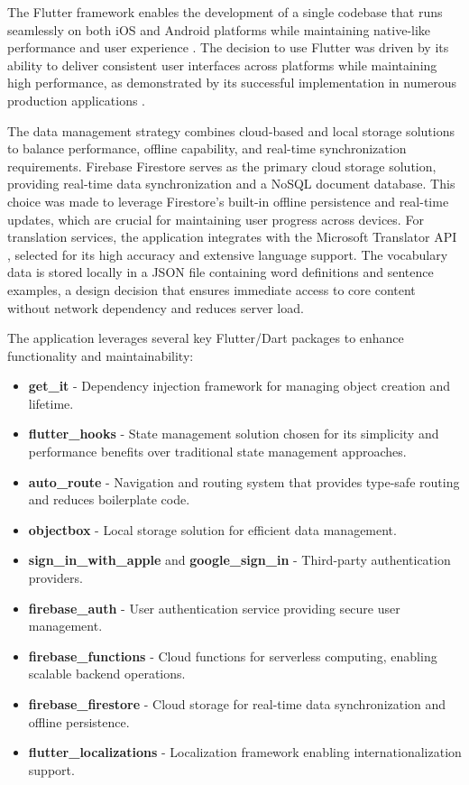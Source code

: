 The Flutter framework enables the development of a single codebase that runs seamlessly on both iOS and Android platforms while maintaining native-like performance and user experience \cite{cite:flutter_framework}. The decision to use Flutter was driven by its ability to deliver consistent user interfaces across platforms while maintaining high performance, as demonstrated by its successful implementation in numerous production applications \cite{cite:google_flutter_case_studies}.

The data management strategy combines cloud-based and local storage solutions to balance performance, offline capability, and real-time synchronization requirements. Firebase Firestore \cite{cite:firebase_firestore} serves as the primary cloud storage solution, providing real-time data synchronization and a NoSQL document database. This choice was made to leverage Firestore's built-in offline persistence and real-time updates, which are crucial for maintaining user progress across devices. For translation services, the application integrates with the Microsoft Translator API \cite{cite:microsoft_translator}, selected for its high accuracy and extensive language support. The vocabulary data is stored locally in a JSON file containing word definitions and sentence examples, a design decision that ensures immediate access to core content without network dependency and reduces server load.

The application leverages several key Flutter/Dart packages to enhance functionality and maintainability:
\begin{itemize}
    \item \textbf{get\_it} - Dependency injection framework for managing object creation and lifetime.
    \item \textbf{flutter\_hooks} - State management solution chosen for its simplicity and performance benefits over traditional state management approaches.
    \item \textbf{auto\_route} - Navigation and routing system that provides type-safe routing and reduces boilerplate code.
    \item \textbf{objectbox} - Local storage solution for efficient data management.
    \item \textbf{sign\_in\_with\_apple} and \textbf{google\_sign\_in} - Third-party authentication providers.
    \item \textbf{firebase\_auth} - User authentication service providing secure user management.
    \item \textbf{firebase\_functions} - Cloud functions for serverless computing, enabling scalable backend operations.
    \item \textbf{firebase\_firestore} - Cloud storage for real-time data synchronization and offline persistence.
    \item \textbf{flutter\_localizations} - Localization framework enabling internationalization support.
\end{itemize}

